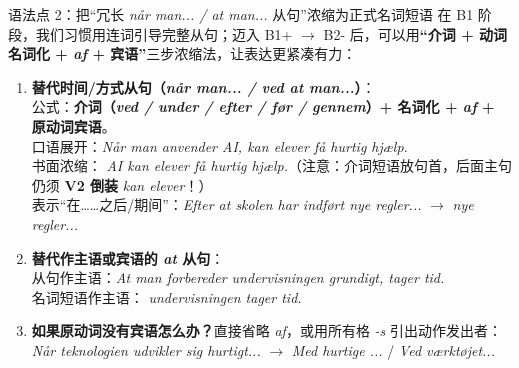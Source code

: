 \begin{grammatikbox}{语法点 2：把“冗长 \textit{når man... / at man...} 从句”浓缩为正式名词短语}
在 B1 阶段，我们习惯用连词引导完整从句；迈入 B1+ $\rightarrow$ B2- 后，可以用\textbf{“介词 + 动词名词化 + \textit{af} + 宾语”}三步浓缩法，让表达更紧凑有力：
\begin{enumerate}
  \item \textbf{替代时间/方式从句（\textit{når man... / ved at man...}）}：\\
    公式：\textbf{介词（\textit{ved / under / efter / før / gennem}）+ 名词化 + \textit{af} + 原动词宾语}。\\
     口语展开：\textit{Når man anvender AI, kan elever få hurtig hjælp.}\\
     书面浓缩：\textit{ AI kan elever få hurtig hjælp.}（注意：介词短语放句首，后面主句仍须 \textbf{V2 倒装} \textit{kan elever}！）\\
     表示“在……之后/期间”：\textit{Efter at skolen har indført nye regler...} $\rightarrow$ \textit{ nye regler...}
  \item \textbf{替代作主语或宾语的 \textit{at} 从句}：\\
     从句作主语：\textit{At man forbereder undervisningen grundigt, tager tid.}\\
     名词短语作主语：\textit{ undervisningen tager tid.}
  \item \textbf{如果原动词没有宾语怎么办？}直接省略 \textit{af}，或用所有格 \textit{-s} 引出动作发出者：\\
    \textit{Når teknologien udvikler sig hurtigt...} $\rightarrow$ \textit{Med  hurtige ...} / \textit{Ved  værktøjet...}
\end{enumerate}
\end{grammatikbox}

